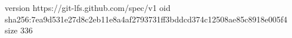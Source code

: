 version https://git-lfs.github.com/spec/v1
oid sha256:7ea9d531e27d8c2eb11e8a4af2793731ff3bddcd374c12508ae85c8918e005f4
size 336
